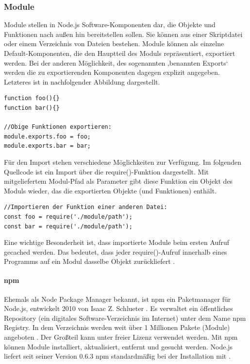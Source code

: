 \newpage
\subsubsection{Module}

\noindent
Module stellen in Node.js Software-Komponenten dar, die Objekte und Funktionen nach außen hin bereitstellen sollen.
Sie können aus einer Skriptdatei oder einem Verzeichnis von Dateien bestehen. Module können als einzelne Default-Komponenten, die den Hauptteil des Moduls repräsentiert, exportiert werden. 
Bei der anderen Möglichkeit, des sogenannten ‚benannten Exports‘ werden die zu exportierenden Komponenten dagegen explizit angegeben. Letzteres ist in nachfolgender Abbildung dargestellt. 
\newline
  
    
\begin{lstlisting}[caption=Benannter Export von Modulen,label=lst:ModuleExport]
function foo(){}
function bar(){}

//Obige Funktionen exportieren:
module.exports.foo = foo;
module.exports.bar = bar;
\end{lstlisting}


\noindent
Für den Import stehen verschiedene Möglichkeiten zur Verfügung.
Im folgenden Quellcode ist ein Import über die require()-Funktion dargestellt. 
Mit mitgeliefertem Modul-Pfad als Parameter gibt diese Funktion ein Objekt des Moduls wieder, das die exportierten Objekte (und Funktionen) enthält.
\newline
  
\begin{lstlisting}[caption=Import von Modulen,label=lst:ModuleImport]
//Importieren der Funktion einer anderen Datei:
const foo = require('./module/path');
const bar = require('./module/path');
\end{lstlisting}

\noindent
Eine wichtige Besonderheit ist, dass importierte Module  beim ersten Aufruf gecached werden. 
Das bedeutet, dass jeder require()-Aufruf innerhalb eines Programms auf ein Modul dasselbe Objekt zurückliefert \cite{Node1.21}.


\paragraph{npm}
Ehemals als Node Package Manager bekannt, ist npm ein Paketmanager für Node.js, entwickelt 2010 von Isaac Z. Schlueter \cite{Node1.3}. Es verwaltet ein öffentliches Repository (ein digitales Software-Verzeichnis im Internet) unter dem Name npm Registry. In dem Verzeichnis werden weit über 1 Millionen Pakete (Module) angeboten \cite{Node1.4}. Der Großteil kann unter freier Lizenz verwendet werden. Mit npm können Module installiert, aktualisiert, entfernt und gesucht werden. Node.js liefert seit seiner Version 0.6.3 npm standardmäßig bei der Installation mit \cite{Node1.5}.

